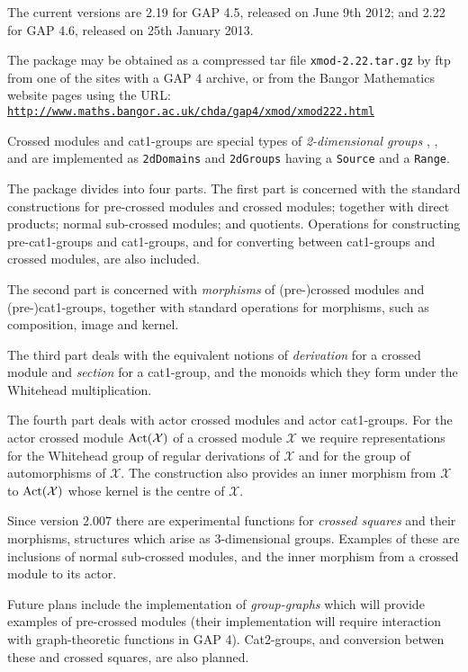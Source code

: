 \documentclass[a4paper,11pt]{report}
\begin{document}
{ The current versions are 2.19 for \textsf{GAP} 4.5, released on June 9th 2012; and 2.22 for \textsf{GAP} 4.6, released on 25th January 2013. 

 The package may be obtained as a compressed tar file \texttt{xmod-2.22.tar.gz} by ftp from one of the sites with a \textsf{GAP} 4 archive, or from the Bangor Mathematics website pages using the URL: \href{http://www.maths.bangor.ac.uk/chda/gap4/xmod/xmod222.html} {\texttt{http://www.maths.bangor.ac.uk/chda/gap4/xmod/xmod222.html}} 

 Crossed modules and cat1-groups are special types of \emph{2-dimensional groups} \cite{B82}, \cite{brow:hig:siv}, and are implemented as \texttt{2dDomains} and \texttt{2dGroups} having a \texttt{Source} and a \texttt{Range}.   

 The package divides into four parts. The first part is concerned with the
standard constructions for pre-crossed modules and crossed modules; together
with direct products; normal sub-crossed modules; and quotients. Operations
for constructing pre-cat1-groups and cat1-groups, and for converting between
cat1-groups and crossed modules, are also included. 

 The second part is concerned with \emph{morphisms} of (pre-)crossed modules and (pre-)cat1-groups, together with standard
operations for morphisms, such as composition, image and kernel. 

 The third part deals with the equivalent notions of \emph{derivation} for a crossed module and \emph{section} for a cat1-group, and the monoids which they form under the Whitehead
multiplication. 

 The fourth part deals with actor crossed modules and actor cat1-groups. For
the actor crossed module ${\rm Act}(\mathcal{X})$ of a crossed module $\mathcal{X}$ we require representations for the Whitehead group of regular derivations of $\mathcal{X}$ and for the group of automorphisms of $\mathcal{X}$. The construction also provides an inner morphism from $\mathcal{X}$ to ${\rm Act}(\mathcal{X})$ whose kernel is the centre of $\mathcal{X}$. 

 Since version 2.007 there are experimental functions for \emph{crossed squares} and their morphisms, structures which arise as $3$-dimensional groups. Examples of these are inclusions of normal sub-crossed
modules, and the inner morphism from a crossed module to its actor. 

 Future plans include the implementation of \emph{group-graphs} which will provide examples of pre-crossed modules (their implementation will
require interaction with graph-theoretic functions in \textsf{GAP} 4). Cat2-groups, and conversion betwen these and crossed squares, are also
planned. 

}
\end{document}
